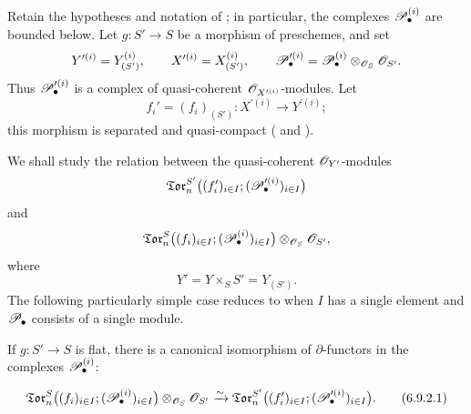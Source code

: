 \begin{env}[6.9.1]
\label{III.6.9.1}
Retain the hypotheses and notation of ; in
particular, the complexes $\mathscr{P}_\bullet^{(i)}$ are bounded below.
Let $g:S'\to S$ be a morphism of preschemes, and set
\[
  Y^{\prime(i)}=Y_{(S')}^{(i)},
  \qquad
  X^{\prime(i)}=X_{(S')}^{(i)},
  \qquad
  \mathscr{P}_\bullet^{\prime(i)}
  =
  \mathscr{P}_\bullet^{(i)}
  \otimes_{\mathscr{O}_S}\mathscr{O}_{S'}.
\]
Thus $\mathscr{P}_\bullet^{\prime(i)}$ is a complex of quasi-coherent
$\mathscr{O}_{X^{\prime(i)}}$-modules.  Let
\[
  f_i'=(f_i)_{(S')}:
  X^{\prime(i)}\longrightarrow Y^{\prime(i)};
\]
this morphism is separated and quasi-compact
( and ).

We shall study the relation between the quasi-coherent
$\mathscr{O}_{Y'}$-modules
\[
  \mathfrak{Tor}_n^{S'}
  \bigl(
    (f_i')_{i\in I};
    (\mathscr{P}_\bullet^{\prime(i)})_{i\in I}
  \bigr)
\]
and
\[
  \mathfrak{Tor}_n^S
  \bigl(
    (f_i)_{i\in I};
    (\mathscr{P}_\bullet^{(i)})_{i\in I}
  \bigr)
  \otimes_{\mathscr{O}_S}\mathscr{O}_{S'},
\]
where
\[
  Y'=Y\times_SS'=Y_{(S')}.
\]
The following particularly simple case reduces to
 when $I$ has a single element and
$\mathscr{P}_\bullet$ consists of a single module.
\end{env}

\begin{proposition}[6.9.2]
\label{III.6.9.2}
If $g:S'\to S$ is flat, there is a canonical isomorphism of
$\partial$-functors in the complexes $\mathscr{P}_\bullet^{(i)}$:
\begin{env}[6.9.2.1]
\label{III.6.9.2.1}
\[
  \mathfrak{Tor}_n^S
  \bigl(
    (f_i)_{i\in I};
    (\mathscr{P}_\bullet^{(i)})_{i\in I}
  \bigr)
  \otimes_{\mathscr{O}_S}\mathscr{O}_{S'}
  \xrightarrow{\sim}
  \mathfrak{Tor}_n^{S'}
  \bigl(
    (f_i')_{i\in I};
    (\mathscr{P}_\bullet^{\prime(i)})_{i\in I}
  \bigr).
  \tag{6.9.2.1}\label{III.6.9.2.1.eq}
\]
\end{env}
\end{proposition}

